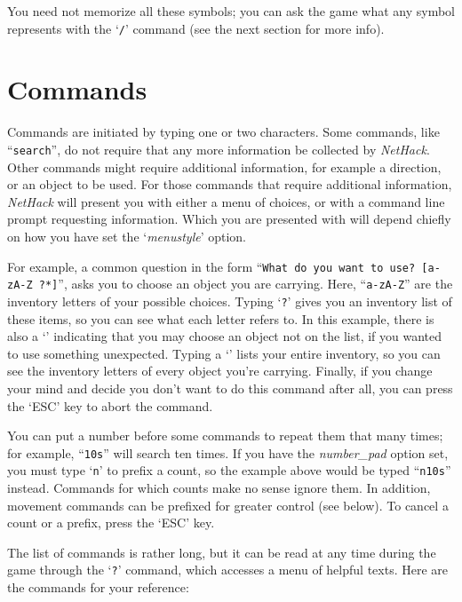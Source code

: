 \elist
You need not memorize all these symbols; you can ask the game what any
symbol represents with the `{\tt /}' command (see the next section for
more info).

\section{Commands}

Commands are initiated by typing one or two characters.  Some commands,
like ``{\tt search}'', do not require that any more information be collected
by {\it NetHack\/}.  Other commands might require additional information, for
example a direction, or an object to be used.  For those commands that
require additional information, {\it NetHack\/} will present you with either 
a menu of choices, or with a command line prompt requesting information.  Which
you are presented with will depend chiefly on how you have set the
`{\it menustyle\/}'
option.

For example, a common question in the form ``{\tt What do you want to
use? [a-zA-Z\ ?*]}'', asks you to choose an object you are carrying.
Here, ``{\tt a-zA-Z}'' are the inventory letters of your possible choices.
Typing `{\tt ?}' gives you an inventory list of these items, so you can see
what each letter refers to.  In this example, there is also a `{\tt *}'
indicating that you may choose an object not on the list, if you
wanted to use something unexpected.  Typing a `{\tt *}' lists your entire
inventory, so you can see the inventory letters of every object you're
carrying.  Finally, if you change your mind and decide you don't want
to do this command after all, you can press the `ESC' key to abort the
command.

You can put a number before some commands to repeat them that many
times; for example, ``{\tt 10s}'' will search ten times.  If you have the
{\it number\_pad\/}
option set, you must type `{\tt n}' to prefix a count, so the example above
would be typed ``{\tt n10s}'' instead.  Commands for which counts make no
sense ignore them.  In addition, movement commands can be prefixed for
greater control (see below).  To cancel a count or a prefix, press the
`ESC' key.

The list of commands is rather long, but it can be read at any time
during the game through the `{\tt ?}' command, which accesses a menu of
helpful texts.  Here are the commands for your reference:

